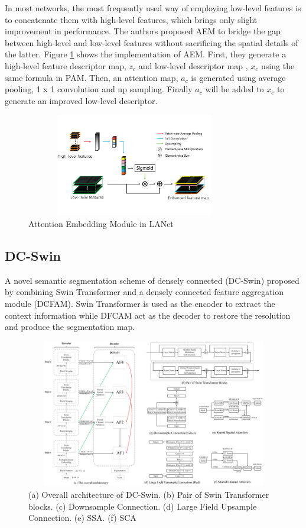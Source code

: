 In most networks, the most frequently used way of employing low-level features is to concatenate them with high-level features, which brings only slight improvement in performance. The authors proposed AEM to bridge the gap between high-level and low-level features without sacrificing the spatial details of the latter. Figure \ref{fig:aem} shows the implementation of AEM. First, they generate a high-level feature descriptor map, $z_c$ and low-level descriptor map , $x_c$ using the same formula in PAM. Then, an attention map, $a_c$ is generated using average pooling, 1 x 1 convolution and up sampling. Finally $a_c$ will be added to $x_c$ to generate an improved low-level descriptor.  
\begin{figure}[ht]
\includegraphics[width=9.5cm, height=4.5cm]{images/aem.png}
\centering
\caption{Attention Embedding Module in LANet \protect\cite{lanet}}
\label{fig:aem}
\end{figure}
\FloatBarrier


\subsection{DC-Swin}
A novel semantic segmentation scheme of densely connected (DC-Swin) \cite{a-novel-transformer} proposed by combining Swin Transformer and a densely connected feature aggregation module (DCFAM). Swin Transformer is used as the encoder to extract the context information while DFCAM act as the decoder to restore the resolution and produce the segmentation map.

\FloatBarrier
\begin{figure}[ht]
\includegraphics[width=12.5cm, height=6.5cm]{images/dc-swin.png}
\centering
\caption{(a) Overall architecture of DC-Swin. (b) Pair of Swin Transformer blocks. (c) Downsample Connection. (d) Large Field Upsample Connection. (e) SSA. (f) SCA \protect\cite{a-novel-transformer}}
\label{fig:dc}
\end{figure}

